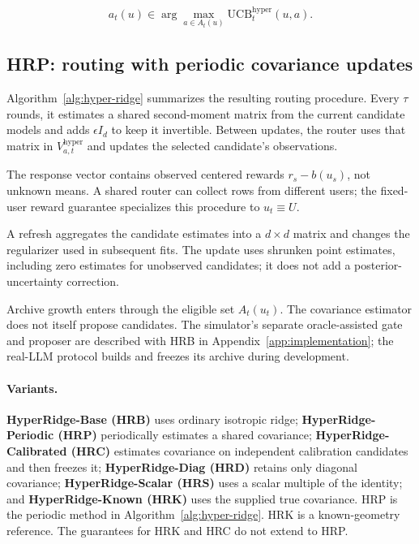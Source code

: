 \documentclass{article} %
\begin{document}
\begin{equation}
a_t(u) \in \arg\max_{a \in A_t(u)} \mathrm{UCB}_t^{\mathrm{hyper}}(u, a).
\end{equation}
\subsection{HRP: routing with periodic covariance updates}

\label{sec:method-alg}

Algorithm~\ref{alg:hyper-ridge} summarizes the resulting routing procedure.
Every $\tau$ rounds, it estimates a shared second-moment matrix from the
current candidate models and adds $\epsilon I_d$ to keep it invertible.
Between updates, the router uses that matrix in
$V_{a,t}^{\mathrm{hyper}}$ and updates the selected candidate's observations.

The response vector contains observed centered rewards $r_s-b(u_s)$, not
unknown means. A shared router can collect rows from different users;
the fixed-user reward guarantee specializes this procedure to $u_t\equiv U$.

A refresh aggregates the candidate estimates into a $d\times d$ matrix and
changes the regularizer used in subsequent fits. The update uses shrunken
point estimates, including zero estimates for unobserved candidates; it does
not add a posterior-uncertainty correction.

Archive growth enters through the eligible set $A_t(u_t)$. The covariance
estimator does not itself propose candidates. The simulator's separate
oracle-assisted gate and proposer are described with HRB in
Appendix~\ref{app:implementation}; the real-LLM protocol builds and freezes
its archive during development.

\FloatBarrier
\paragraph{Variants.}
\textbf{HyperRidge-Base (HRB)} uses ordinary isotropic ridge;
\textbf{HyperRidge-Periodic (HRP)} periodically estimates a shared covariance;
\textbf{HyperRidge-Calibrated (HRC)} estimates covariance on independent
calibration candidates and then freezes it;
\textbf{HyperRidge-Diag (HRD)} retains only diagonal covariance;
\textbf{HyperRidge-Scalar (HRS)} uses a scalar multiple of the identity; and
\textbf{HyperRidge-Known (HRK)} uses the supplied true covariance.
HRP is the periodic method in Algorithm~\ref{alg:hyper-ridge}.
HRK is a known-geometry reference.
The guarantees for HRK and HRC do not extend to HRP.
\end{document}
